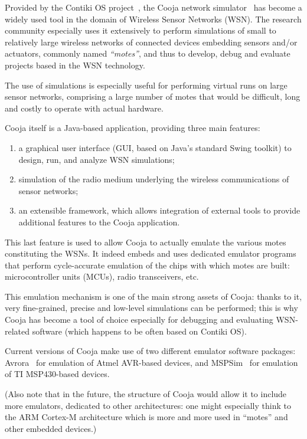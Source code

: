 \documentclass[10pt]{ewsn-proc}
\begin{document}
Provided by the Contiki OS project~\cite{ContikiOS}, the Cooja network
simulator~\cite{Cooja} has become a widely used tool in the domain of
Wireless Sensor Networks (WSN). The research community especially uses
it extensively to perform simulations of small to relatively large wireless
networks of connected devices embedding sensors and/or actuators, commonly
named \emph{``motes''}, and thus to develop, debug and evaluate projects
based in the WSN technology.

The use of simulations is especially useful for performing virtual runs
on large sensor networks, comprising a large number of motes that would
be difficult, long and costly to operate with actual hardware.

\medskip

Cooja itself is a Java-based application, providing three main features:
\begin{enumerate}
\item a graphical user interface (GUI, based on Java's standard Swing toolkit)
to design, run, and analyze WSN simulations;
\item simulation of the radio medium underlying the wireless communications
of sensor networks;
\item an extensible framework, which allows integration of external tools
to provide additional features to the Cooja application.
\end{enumerate}

\medskip

This last feature is used to allow Cooja to actually emulate the various
motes constituting the WSNs. It indeed embeds and uses dedicated emulator
programs that perform cycle-accurate emulation of the chips with which motes
are built: microcontroller units (MCUs), radio transceivers, etc.

This emulation mechanism is one of the main strong assets of Cooja:
thanks to it, very fine-grained, precise and low-level simulations
can be performed; this is why Cooja has become a tool of choice especially
for debugging and evaluating WSN-related software (which happens to be
often based on Contiki OS).

Current versions of Cooja make use of two different emulator software
packages: Avrora~\cite{Avrora} for emulation of Atmel AVR-based devices,
and MSPSim~\cite{MSPSim} for emulation of TI MSP430-based devices.

(Also note that in the future, the structure of Cooja would allow it
to include more emulators, dedicated to other architectures: one might
especially think to the ARM Cortex-M architecture which is more and
more used in ``motes'' and other embedded devices.)
\end{document}
